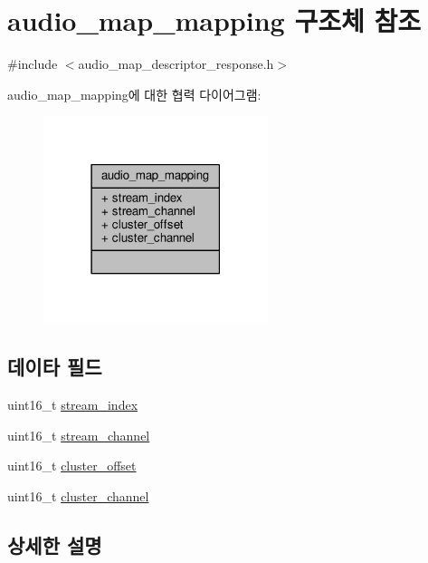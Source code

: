 \hypertarget{structavdecc__lib_1_1audio__map__mapping}{}\section{audio\+\_\+map\+\_\+mapping 구조체 참조}
\label{structavdecc__lib_1_1audio__map__mapping}


{\ttfamily \#include $<$audio\+\_\+map\+\_\+descriptor\+\_\+response.\+h$>$}



audio\+\_\+map\+\_\+mapping에 대한 협력 다이어그램\+:
\nopagebreak
\begin{figure}[H]
\begin{center}
\leavevmode
\includegraphics[width=186pt]{structavdecc__lib_1_1audio__map__mapping__coll__graph}
\end{center}
\end{figure}
\subsection*{데이타 필드}
\begin{DoxyCompactItemize}
\item 
uint16\+\_\+t \hyperlink{structavdecc__lib_1_1audio__map__mapping_acad3919f1d34fc0ae26a5508175defb1}{stream\+\_\+index}
\item 
uint16\+\_\+t \hyperlink{structavdecc__lib_1_1audio__map__mapping_a99de82258f8163098a8ff558abf07af7}{stream\+\_\+channel}
\item 
uint16\+\_\+t \hyperlink{structavdecc__lib_1_1audio__map__mapping_ad255a47e83b1a3056865a81c5f3a2545}{cluster\+\_\+offset}
\item 
uint16\+\_\+t \hyperlink{structavdecc__lib_1_1audio__map__mapping_ad7ad28dde5b77668bff26372dab9ea76}{cluster\+\_\+channel}
\end{DoxyCompactItemize}


\subsection{상세한 설명}


